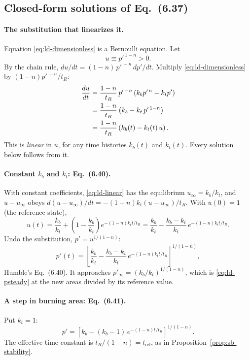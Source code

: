 \subsection{Closed-form solutions of Eq.~(6.37)}
\label{sec:ld-closed}
\paragraph{The substitution that linearizes it.} Equation
\eqref{eq:ld-dimensionless} is a Bernoulli equation. Let
\[
 u\equiv p'^{\,1-n}>0 .
\]
By the chain rule,
$du/dt=(1-n)\,p'^{\,-n}\,dp'/dt$. Multiply
\eqref{eq:ld-dimensionless} by $(1-n)p'^{\,-n}/t_R$:
\begin{align}
 \frac{du}{dt}
 &=\frac{1-n}{t_R}\,p'^{\,-n}\left(k_bp'^{\,n}-k_tp'\right)
 \notag\\
 &=\frac{1-n}{t_R}\left(k_b-k_t\,p'^{\,1-n}\right)
 \notag\\
 &=\frac{1-n}{t_R}\left(k_b(t)-k_t(t)\,u\right).
 \label{eq:ld-linear}
\end{align}
This is \emph{linear} in $u$, for any time histories $k_b(t)$ and
$k_t(t)$. Every solution below follows from it.

\paragraph{Constant $k_b$ and $k_t$: Eq.~(6.40).} With constant
coefficients, \eqref{eq:ld-linear} has the equilibrium $u_\infty=k_b/k_t$,
and $u-u_\infty$ obeys
$d(u-u_\infty)/dt=-(1-n)k_t(u-u_\infty)/t_R$. With $u(0)=1$
(the reference state),
\[
 u(t)=\frac{k_b}{k_t}
      +\left(1-\frac{k_b}{k_t}\right)e^{-(1-n)k_tt/t_R}
     =\frac{k_b}{k_t}-\frac{k_b-k_t}{k_t}\,e^{-(1-n)k_tt/t_R}.
\]
Undo the substitution, $p'=u^{1/(1-n)}$:
\begin{equation}\label{eq:ld-640}
 p'(t)=\left[\frac{k_b}{k_t}
       -\frac{k_b-k_t}{k_t}\,e^{-(1-n)k_tt/t_R}\right]^{1/(1-n)},
\end{equation}
Humble's Eq.~(6.40). It approaches
$p'_\infty=(k_b/k_t)^{1/(1-n)}$, which is
\eqref{eq:ld-psteady} at the new areas divided by its reference value.

\paragraph{A step in burning area: Eq.~(6.41).} Put $k_t=1$:
\[
 p'=\left[k_b-(k_b-1)\,e^{-(1-n)t/t_R}\right]^{1/(1-n)}.
\]
The effective time constant is $t_R/(1-n)=t_{\mathrm{rel}}$, as in
Proposition~\ref{prop:sb-stability}.

